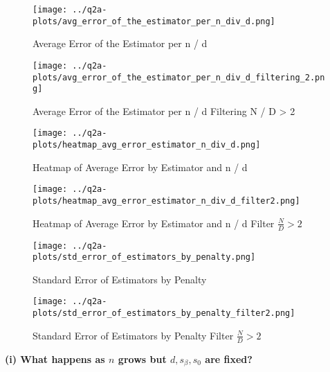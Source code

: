 \documentclass{article}
\begin{document}
{%
\begin{figure}[H]
  \centering
  \texttt{[image: ../q2a-plots/avg\_error\_of\_the\_estimator\_per\_n\_div\_d.png]}
  \caption{Average Error of the Estimator per n / d}
\end{figure}

\begin{figure}[H]
  \centering
  \texttt{[image: ../q2a-plots/avg\_error\_of\_the\_estimator\_per\_n\_div\_d\_filtering\_2.png]}
  \caption{Average Error of the Estimator per n / d Filtering N / D > 2}
\end{figure}

\begin{figure}[H]
  \centering
  \texttt{[image: ../q2a-plots/heatmap\_avg\_error\_estimator\_n\_div\_d.png]}
  \caption{Heatmap of Average Error by Estimator and n / d}
\end{figure}

\begin{figure}[H]
  \centering
  \texttt{[image: ../q2a-plots/heatmap\_avg\_error\_estimator\_n\_div\_d\_filter2.png]}
  \caption{Heatmap of Average Error by Estimator and n / d Filter $\frac{N}{D} > 2$}
\end{figure}

\begin{figure}[H]
  \centering
  \texttt{[image: ../q2a-plots/std\_error\_of\_estimators\_by\_penalty.png]}
  \caption{Standard Error of Estimators by Penalty}
\end{figure}

\begin{figure}[H]
  \centering
  \texttt{[image: ../q2a-plots/std\_error\_of\_estimators\_by\_penalty\_filter2.png]}
  \caption{Standard Error of Estimators by Penalty Filter $\frac{N}{D} > 2$}
\end{figure}

}{}

\textbf{(i) What happens as \( n \) grows but \( d, s_\beta, s_0 \) are fixed?}
\end{document}
